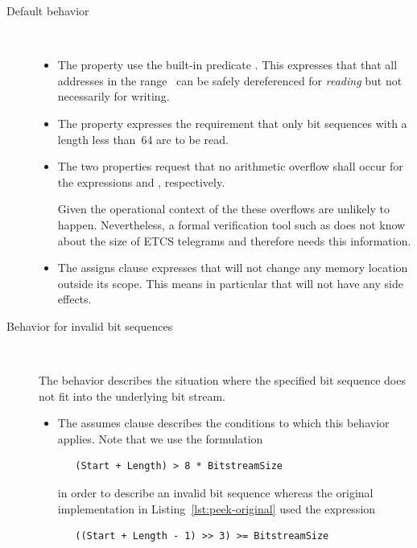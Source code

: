 \begin{description}
\item[Default behavior]~

\begin{itemize}
\item
The property  use the built-in \acsl predicate .
This expresses that that all addresses in the range~
can be safely dereferenced for \emph{reading} but not necessarily for writing.

\item
The property  expresses the requirement that only
bit sequences with a length less than~64 are to be read.

\item
The two  properties request that no arithmetic overflow
shall occur for the expressions  and
, respectively.

Given the operational context of the \bitwalker these overflows are unlikely
to happen. 
Nevertheless, a formal verification tool such as \framacwp does not
know about the size of ETCS telegrams and therefore needs this information.

\item
The assigns clause expresses that \peek will not change any memory location
outside its scope.
This means in particular that \peek will not have any side effects.
      
\end{itemize}

\item[Behavior for invalid bit sequences]~

The behavior  describes the situation where
the specified bit sequence does not fit into the underlying bit stream.

\begin{itemize}
\item
The assumes clause describes the conditions to which this behavior applies.
Note that we use the formulation 
\begin{verbatim}
   (Start + Length) > 8 * BitstreamSize
\end{verbatim}
in order to describe an invalid bit sequence whereas the original implementation
in Listing~\ref{lst:peek-original} used the expression
\begin{verbatim}
   ((Start + Length - 1) >> 3) >= BitstreamSize
\end{verbatim}


\end{itemize}
\end{description}
